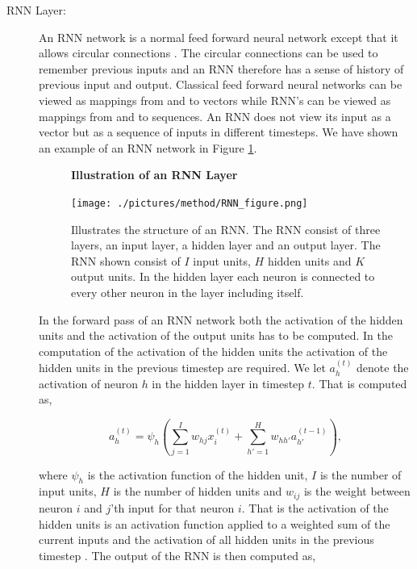 \begin{description}
    \item[\gls{RNN} Layer:]

        An RNN network is a normal feed forward neural network except that
        it allows circular connections \cite{DBLP:series/sci/2012-385}. The
        circular connections can be used to remember previous inputs and an
        \gls{RNN} therefore has a sense of history of previous input and output.
        Classical feed forward neural networks can be viewed as mappings from
        and to vectors while \gls{RNN}'s can be viewed as mappings from and to
        sequences. An \gls{RNN} does not view its input as a vector but as a
        sequence of inputs in different timesteps. We have shown an example of
        an \gls{RNN} network in Figure \ref{fig:rnn_illustration}.

        \begin{figure}
            \centering
            \textbf{Illustration of an \gls{RNN} Layer}\par\medskip
            \texttt{[image: ./pictures/method/RNN\_figure.png]}
            \caption{Illustrates the structure of an \gls{RNN}. The \gls{RNN}
                consist of three layers, an input layer, a hidden layer and an
                output layer. The \gls{RNN} shown consist of $I$ input units,
                $H$ hidden units and $K$ output units. In the hidden layer each
                neuron is connected to every other neuron in the layer including
                itself.}
            \label{fig:rnn_illustration}
        \end{figure}

        In the forward pass of an \gls{RNN} network both the activation of the
        hidden units and the activation of the output units has to be computed.
        In the computation of the activation of the hidden units the activation
        of the hidden units in the previous timestep are required. We let
        $a^{(t)}_h$ denote the activation of neuron $h$ in the hidden layer in
        timestep $t$. That is computed as,

        \begin{equation}
            a^{(t)}_h = \psi_h\left(
                \sum_{j=1}^I w_{hj} x^{(t)}_i +
                \sum_{h'=1}^H w_{hh'} a^{(t-1)}_{h'}
            \right),
        \end{equation}

        where $\psi_h$ is the activation function of the hidden unit, $I$ is the
        number of input units, $H$ is the number of hidden units and $w_{ij}$ is
        the weight between neuron $i$ and $j$'th input for that neuron $i$. That
        is the activation of the hidden units is an activation function applied
        to a weighted sum of the current inputs and the activation of all hidden
        units in the previous timestep \cite{DBLP:series/sci/2012-385}. The
        output of the \gls{RNN} is then computed as,


\end{description}
